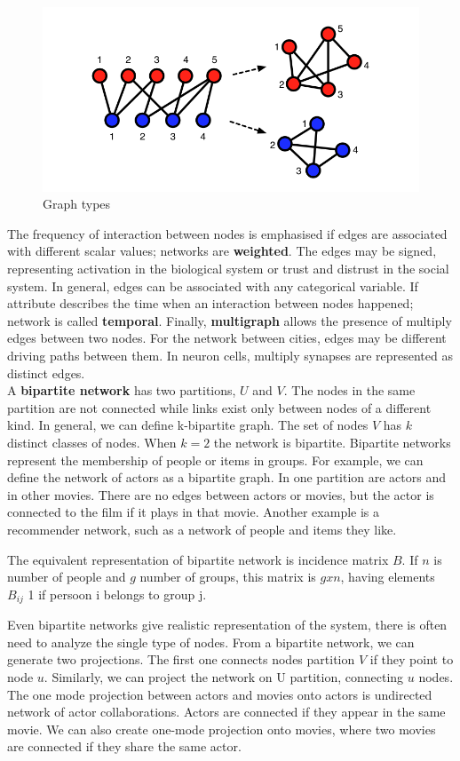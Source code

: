 \begin{figure}[h!]
	\centering
	\includegraphics[width=0.8\linewidth]{figures/methodology/graph2.png} 
	\caption{Graph types}
	\label{fig:gt2}
\end{figure}

The frequency of interaction between nodes is emphasised if edges are associated with different scalar values; networks are \textbf{weighted}. The edges may be signed, representing activation in the biological system or trust and distrust in the social system. In general, edges can be associated with any categorical variable. If attribute describes the time when an interaction between nodes happened; network is called \textbf{temporal}. Finally, \textbf{multigraph} allows the presence of multiply edges between two nodes. For the network between cities, edges may be different driving paths between them. In neuron cells, multiply synapses are represented as distinct edges. \\

A \textbf{bipartite network} has two partitions, $U$ and $V$. The nodes in the same partition are not connected while links exist only between nodes of a different kind. In general, we can define k-bipartite graph. The set of nodes $V$ has $k$ distinct classes of nodes. When $k=2$ the network is bipartite.  Bipartite networks represent the membership of people or items in groups. For example, we can define the network of actors as a bipartite graph. In one partition are actors and in other movies. There are no edges between actors or movies, but the actor is connected to the film if it plays in that movie. Another example is a recommender network, such as a network of people and items they like. 

The equivalent representation of bipartite network is incidence matrix $B$. If $n$ is number of people and $g$ number of groups, this matrix is $g x n$, having elements $B_{ij}$ 1 if persoon i belongs to group j. 

Even bipartite networks give realistic representation of the system, there is often need to analyze the single type of nodes.  From a bipartite network, we can generate two projections. The first one connects nodes partition $V$ if they point to node $u$. Similarly, we can project the network on U partition, connecting $u$ nodes. The one mode projection between actors and movies onto actors is undirected network of actor collaborations. Actors are connected if they appear in the same movie. We can also create one-mode projection onto movies, where two movies are connected if they share the same actor.  

